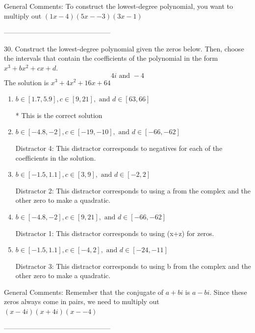 \documentclass{article}[10pt]
\begin{document}
General Comments: To construct the lowest-degree polynomial, you want to multiply out $(1x-4)(5x--3)(3x-1)$

-----------------------------------------------

30. Construct the lowest-degree polynomial given the zeros below. Then, choose the intervals that contain the coefficients of the polynomial in the form $x^3+bx^2+cx+d$.
$$ 4i \text{ and } -4 $$ 
The solution is $ x^3 + 4 x^2 + 16 x + 64 $ 

\begin{enumerate}[label=\Alph*.] 
\item $ b \in [1.7, 5.9], c \in [9, 21], \text{ and } d \in [63, 66] $ 

 * This is the correct solution 
\item $ b \in [-4.8, -2], c \in [-19, -10], \text{ and } d \in [-66, -62] $ 

  Distractor 4: This distractor corresponds to negatives for each of the coefficients in the solution. 
\item $ b \in [-1.5, 1.1], c \in [3, 9], \text{ and } d \in [-2, 2] $ 

  Distractor 2: This distractor corresponds to using a from the complex and the other zero to make a quadratic. 
\item $ b \in [-4.8, -2], c \in [9, 21], \text{ and } d \in [-66, -62] $ 

  Distractor 1: This distractor corresponds to using (x+z) for zeros. 
\item $ b \in [-1.5, 1.1], c \in [-4, 2], \text{ and } d \in [-24, -11] $ 

  Distractor 3: This distractor corresponds to using b from the complex and the other zero to make a quadratic. 
\end{enumerate} 
 
General Comments: Remember that the conjugate of $a+bi$ is $a-bi$. Since these zeros always come in pairs, we need to multiply out $(x-4i)(x+4i)(x--4)$

-----------------------------------------------
\end{document}
